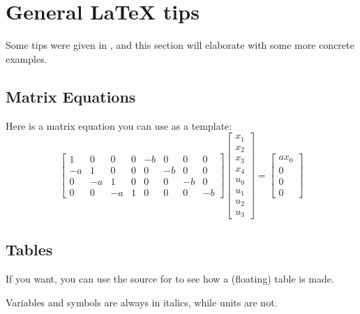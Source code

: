 \newcommand{\texMacro}[2]{\texttt{\textbackslash{#1}\{#2\}}}
\section{General LaTeX tips}\label{sec:latex_tips}
Some tips were given in , and this section will elaborate with some more concrete examples.

\subsection{Matrix Equations}
Here is a matrix equation you can use as a template:
\begin{equation}
	\begin{bmatrix}
		1 &  0 &  0 & 0 & -b &  0 &  0 &  0 \\
		-a &  1 &  0 & 0 &  0 & -b &  0 &  0 \\
		0 & -a &  1 & 0 &  0 &  0 & -b &  0 \\
		0 &  0 & -a & 1 &  0 &  0 &  0 & -b                                
	\end{bmatrix}
	\begin{bmatrix} x_1 \\ x_2 \\ x_3 \\ x_4 \\ u_0 \\ u_1 \\ u_2 \\ u_3 \end{bmatrix}
	=
	\begin{bmatrix}
		ax_0 \\ 0 \\ 0 \\ 0      
	\end{bmatrix}
\end{equation}

\subsection{Tables}
If you want, you can use the source for  to see how a (floating) table is made. 

Variables and symbols are always in italics, while units are not.

